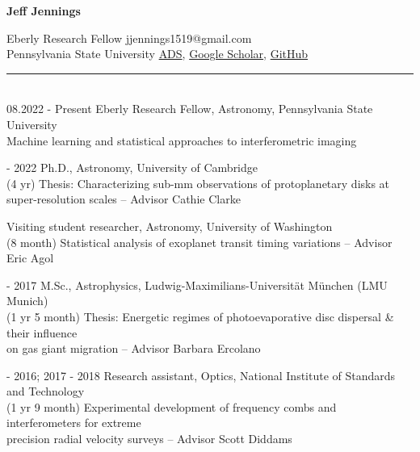 \documentclass[10pt,preprint]{aastex}
\newcommand*{\xdash}[1][3em]{\rule[0.5ex]{#1}{0.7pt}}
\begin{document}
\begin{center}
{\bf{\large Jeff Jennings}}
\end{center}
Eberly Research Fellow \hfill
\hfill jjennings1519@gmail.com\\
Pennsylvania State University \hfill
\hfill \href{https://ui.adsabs.harvard.edu/search/q=orcid\%3A0000-0002-7032-2350&sort=date+desc}{ADS}, \href{http://bit.ly/jennings_googlescholar}{Google Scholar}, \href{http://github.com/jeffjennings}{GitHub}

 \xdash[69ex] \\ %
08.2022 - Present \-\hspace{1.3cm} Eberly Research Fellow, Astronomy, Pennsylvania State University \\
\-\hspace{4.51cm}Machine learning and statistical approaches to interferometric imaging

 - 2022 \-\hspace{2.2cm} Ph.D., Astronomy, University of Cambridge \\
(4 yr) \-\hspace{3.5cm}Thesis: Characterizing sub-mm observations of protoplanetary disks at \\
\-\hspace{4.4cm} super-resolution scales -- Advisor Cathie Clarke

 \-\hspace{3.25cm} Visiting student researcher, Astronomy, University of Washington\\
(8 month) \-\hspace{2.85cm}Statistical analysis of exoplanet transit timing variations -- Advisor Eric Agol

 - 2017 \-\hspace{2.2cm} M.Sc., Astrophysics, Ludwig-Maximilians-Universit{\"a}t M{\"u}nchen (LMU Munich)\\
(1 yr 5 month) \-\hspace{2.1cm}Thesis: Energetic regimes of photoevaporative disc dispersal \& their influence \\
\-\hspace{4.55cm}on gas giant migration -- Advisor Barbara Ercolano

 - 2016; 2017 - 2018 \-\hspace{.22cm} Research assistant, Optics, National Institute of Standards and Technology\\
(1 yr 9 month) \-\hspace{2.2cm}Experimental development of frequency combs and interferometers for extreme \\ \-\hspace{4.55cm}precision radial velocity surveys -- Advisor Scott Diddams 
\end{document}
